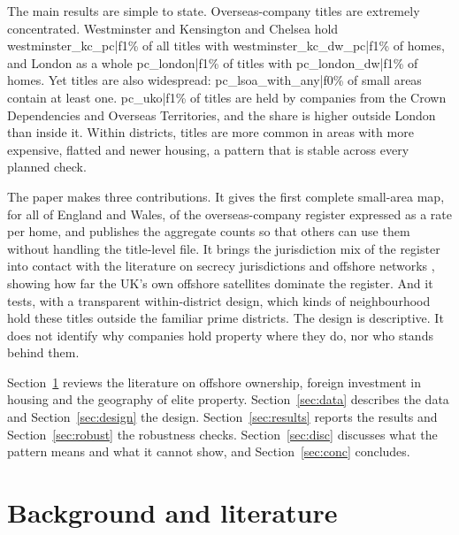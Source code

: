 \documentclass[11pt,a4paper]{article}
\begin{document}
The main results are simple to state. Overseas-company titles are extremely concentrated. Westminster and Kensington and Chelsea hold {{westminster_kc_pc|f1}}\% of all titles with {{westminster_kc_dw_pc|f1}}\% of homes, and London as a whole {{pc_london|f1}}\% of titles with {{pc_london_dw|f1}}\% of homes. Yet titles are also widespread: {{pc_lsoa_with_any|f0}}\% of small areas contain at least one. {{pc_uko|f1}}\% of titles are held by companies from the Crown Dependencies and Overseas Territories, and the share is higher outside London than inside it. Within districts, titles are more common in areas with more expensive, flatted and newer housing, a pattern that is stable across every planned check.

The paper makes three contributions. It gives the first complete small-area map, for all of England and Wales, of the overseas-company register expressed as a rate per home, and publishes the aggregate counts so that others can use them without handling the title-level file. It brings the jurisdiction mix of the register into contact with the literature on secrecy jurisdictions and offshore networks \citep{cobham2015,garcia2017}, showing how far the UK's own offshore satellites dominate the register. And it tests, with a transparent within-district design, which kinds of neighbourhood hold these titles outside the familiar prime districts. The design is descriptive. It does not identify why companies hold property where they do, nor who stands behind them.

Section~\ref{sec:lit} reviews the literature on offshore ownership, foreign investment in housing and the geography of elite property. Section~\ref{sec:data} describes the data and Section~\ref{sec:design} the design. Section~\ref{sec:results} reports the results and Section~\ref{sec:robust} the robustness checks. Section~\ref{sec:disc} discusses what the pattern means and what it cannot show, and Section~\ref{sec:conc} concludes.

\section{Background and literature}\label{sec:lit}
\end{document}
